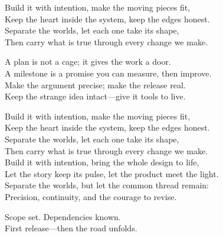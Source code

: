 \begin{lyrics}
Build it with intention, make the moving pieces fit,\\
Keep the heart inside the system, keep the edges honest.\\
Separate the worlds, let each one take its shape,\\
Then carry what is true through every change we make.

A plan is not a cage; it gives the work a door.\\
A milestone is a promise you can measure, then improve.\\
Make the argument precise; make the release real.\\
Keep the strange idea intact—give it tools to live.

Build it with intention, make the moving pieces fit,\\
Keep the heart inside the system, keep the edges honest.\\
Separate the worlds, let each one take its shape,\\
Then carry what is true through every change we make.\\
Build it with intention, bring the whole design to life,\\
Let the story keep its pulse, let the product meet the light.\\
Separate the worlds, but let the common thread remain:\\
Precision, continuity, and the courage to revise.

Scope set. Dependencies known.\\
First release—then the road unfolds.
\end{lyrics}

